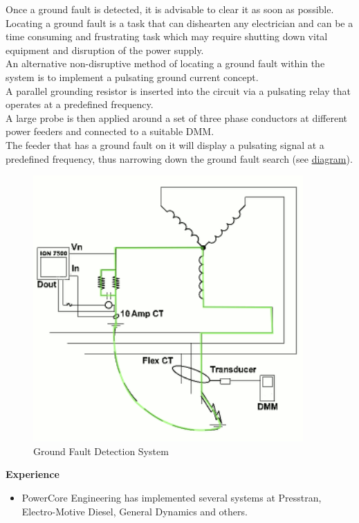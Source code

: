 Once a ground fault is detected, it is advisable to clear it as soon as possible. Locating a ground fault is a task that can dishearten any electrician and can be a time consuming and frustrating task which may require shutting down vital equipment and disruption of the power supply. \\

An alternative non-disruptive method of locating a ground fault within the system is to implement a pulsating ground current concept.\\

A parallel grounding resistor is inserted into the circuit via a pulsating relay that operates at a predefined frequency.\\

A large probe is then applied around a set of three phase conductors at different power feeders and connected to a suitable DMM.\\

The feeder that has a ground fault on it will display a pulsating signal at a predefined frequency, thus narrowing down the ground fault search (see \hyperref[htbp]{diagram}).\\

\begin{figure}[htbp]
	\includegraphics[height=4in]{../Images/locator-diagram.png}

	\caption{Ground Fault Detection System}
	\label{fig:GroundFaultDetectionSystem}
\end{figure}

\textbf{Experience}\\
\begin{itemize}
	\item PowerCore Engineering has implemented several systems at Presstran, Electro-Motive Diesel, General Dynamics and others.
\end{itemize}

